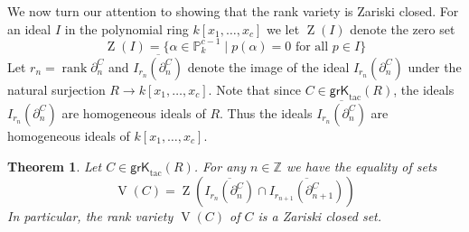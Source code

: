 \documentclass{amsart}[11pt]
\newcommand{\rank}{\operatorname{rank}}
\newcommand{\V}{\operatorname{V}}
\newcommand{\Z}{\operatorname{Z}}
\newcommand{\grKtac}{\operatorname{\mathsf{grK}_{tac}}\nolimits}
\numberwithin{equation}{section}
\theoremstyle{plain}
\newtheorem{theorem}{Theorem}[section]
\newtheorem*{Main Theorem}{Main Theorem}
\theoremstyle{definition}
\theoremstyle{remark}
\numberwithin{equation}{theorem}
\begin{document}
We now turn our attention to showing that the rank variety is Zariski closed.  For an ideal $I$ 
in the polynomial ring $k[x_1,\dots,x_c]$ we let $\Z(I)$ denote the zero set
\[
\Z(I)=\{\alpha\in\mathbb P_k^{c-1}\mid p(\alpha)=0\text { for all } p\in I\}
\]
Let $r_n=\rank\partial^C_n$ and $\overline{I_{r_n}(\partial^C_n)}$ denote the image of the ideal 
$I_{r_n}(\partial^C_n)$ under the natural surjection $R\to k[x_1,\dots,x_c]$. Note that since 
$C\in\grKtac(R)$, the ideals $I_{r_n}(\partial^C_n)$ are homogeneous ideals of $R$.  Thus the ideals 
$\overline{I_{r_n}(\partial^C_n)}$ are homogeneous ideals of $k[x_1,\dots,x_c]$.

\begin{theorem}\label{closed} Let $C\in\grKtac(R)$. For any $n\in\mathbb Z$ we have the equality of sets
\[
\V(C)=\Z\left(\overline{I_{r_n}(\partial^C_n)}\cap\overline{I_{r_{n+1}}(\partial^C_{n+1})}\right)
\]
In particular, the rank variety $\V(C)$ of $C$ is a Zariski closed set.
\end{theorem}
\end{document}
